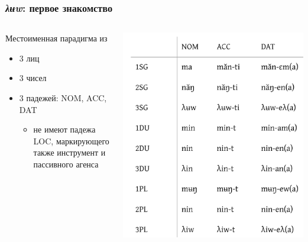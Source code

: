 \documentclass{beamer}
\begin{document}
\begin{frame}
    \frametitle{\textit{λʉw}: первое знакомство}
    
    \begin{columns}
        \begin{column}{0.5\textwidth}
            Местоименная парадигма из
            \begin{itemize}
                \item 3 лиц
                \item 3 чисел
                \item 3 падежей: NOM, ACC, DAT
                \begin{itemize}
                    \item не имеют падежа LOC, маркирующего также инструмент и пассивного агенса
                \end{itemize}
            \end{itemize}
        \end{column}

        \begin{column}{0.5\textwidth}
            \includegraphics[width = \textwidth]{paradigm.png}
        \end{column}
    \end{columns}
    
\end{frame}
\end{document}
